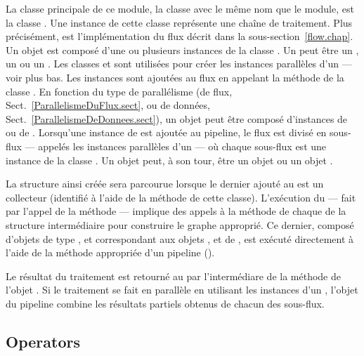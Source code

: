 La classe principale de ce module, la classe avec le m\^eme nom que le module, est la classe . Une instance de cette classe repr\'esente une cha\^ine de traitement. Plus pr\'ecis\'ement,  est l'impl\'ementation du flux  d\'ecrit dans la sous-section~\ref{flow.chap}. Un objet  est compos\'e d'une ou plusieurs instances de la classe . Un  peut \^etre un , un  ou un . Les classes  et  sont utilis\'ees pour cr\'eer les instances parall\`eles d'un  — voir plus bas. Les instances  sont ajout\'ees au flux en appelant la m\'ethode  de la classe . En fonction du type de parall\'elisme (de flux, Sect.~\ref{ParallelismeDuFlux.sect}, ou de donn\'ees, Sect.~\ref{ParallelismeDeDonnees.sect}), un objet  peut \^etre compos\'e d'instances de  ou  de . Lorsqu'une instance de  est ajout\'ee au {pipeline}, le flux est divis\'e en sous-flux --- appel\'es les instances parall\`eles d'un  --- où chaque sous-flux est une instance de la classe . Un objet  peut, \`a son tour, \^etre un objet  ou un objet .

La structure ainsi cr\'e\'ee sera parcourue lorsque le dernier  ajout\'e au  est un collecteur (identifi\'e \`a l'aide de la m\'ethode  de cette classe). L'ex\'ecution du  --- fait par l'appel de la m\'ethode  --- implique des appels \`a la m\'ethode  de chaque  de la structure intermédiaire pour construire le graphe  appropri\'e. Ce dernier, compos\'e d'objets de type ,  et  correspondant aux objets ,  et  de , est ex\'ecut\'e directement à l'aide de la méthode appropriée d'un pipeline  ().

Le r\'esultat du traitement est retourn\'e au  par l'intermédiare de la méthode  de l'objet . Si le traitement se fait en parallèle en utilisant les instances d'un , l'objet  du pipeline combine les r\'esultats partiels obtenus de chacun des sous-flux.



\subsection{Operators}


